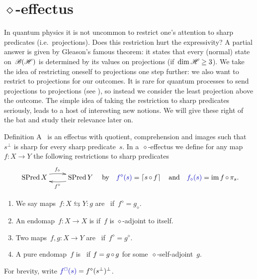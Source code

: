\documentclass[b]{subfiles}
\begin{document}
\section{$\diamond$-effectus}
\begin{parsec}%
\begin{point}%
In quantum physics it is not uncommon to restrict one's attention
    to sharp predicates (i.e.~projections).
Does this restriction hurt the expressivity?
A partial answer is given by Gleason's famous theorem:
    it states that every (normal) state on~$\mathscr{B}(\mathscr{H})$
    is determined by its values on projections
    (if~$\dim \mathscr{H} \geq 3$).
We take the idea of restricting oneself to projections
    one step further: we also want to restrict to projections
    for our outcomes.
It is rare for quantum processes to send projections to projections
    (see ),
    so instead we consider the least projection above the outcome.
The simple idea of taking the restriction to sharp predicates
    seriously, leads to a host of interesting new notions.
We will give these right of the bat and study their relevance later on.
\end{point}
\begin{point}{Definition}%
A~
    is an effectus with quotient, comprehension and images
    such that~$s^\perp$ is sharp for every sharp predicate~$s$.
In a~$\diamond$-effectus
    we define for any map~$f\colon X \to Y$
    the following restrictions to sharp predicates
    \begin{equation*}
        \xymatrix{
            \SPred X  \ar@/^/[r]^{f_\diamond}
            & \SPred Y \ar@/^/[l]^{f^\diamond}}
            \quad \text{by} \quad
            \Define{f^\diamond(s)} = \ceil{s \after f}
            \quad
            \text{and}
            \quad
            \Define{f_\diamond(s)} = \IM f \after \pi_s.
    \end{equation*}
    \begin{enumerate}
        \item
    We say maps~$f \colon X \leftrightarrows Y\colon g$
        are~
        if~$f^\diamond = g_\diamond$.
    \item
    An endomap~$f\colon X \to X$ is 
        if~$f$ is $\diamond$-adjoint to itself.
    \item
    Two maps~$f,g\colon X \to Y$
        are~
        if~$f^\diamond = g^\diamond$.
    \item
        A pure endomap~$f$ is~
            if $f = g\mathop{\circ} g$ for some~$\diamond$-self-adjoint~$g$.
    \end{enumerate}
For brevity, write $\Define{f^\BOX(s)} = f^\diamond(s^\perp)^\perp$.
\end{point}
\end{parsec}
\end{document}
